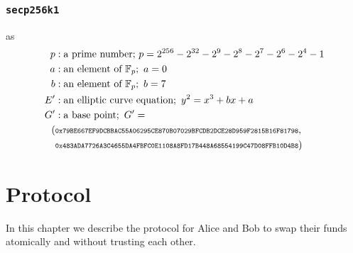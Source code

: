 \documentclass{llncs}
\begin{document}
\subsubsection{\texttt{secp256k1}} as
\begin{equation}
\begin{split}
    p&: \text{a prime number;}\ p = 2^{256} - 2^{32} - 2^9 - 2^8 - 2^7 - 2^6 - 2^4 - 1 \\
    a&: \text{an element of } \mathbb{F}_p;\ a = 0 \\
    b&: \text{an element of } \mathbb{F}_p;\ b = 7 \\
    E'&: \text{an elliptic curve equation};\ y^2 = x^3 + bx + a \\
    G'&: \text{a base point};\ G' = \\ (&\texttt{\scriptsize0x79BE667EF9DCBBAC55A06295CE870B07029BFCDB2DCE28D959F2815B16F81798},\\ &\texttt{\scriptsize0x483ADA7726A3C4655DA4FBFC0E1108A8FD17B448A68554199C47D08FFB10D4B8}) \\
\end{split}
\end{equation}

\section{Protocol}
In this chapter we describe the protocol for Alice and Bob to swap their funds atomically and without trusting each other.
\end{document}

